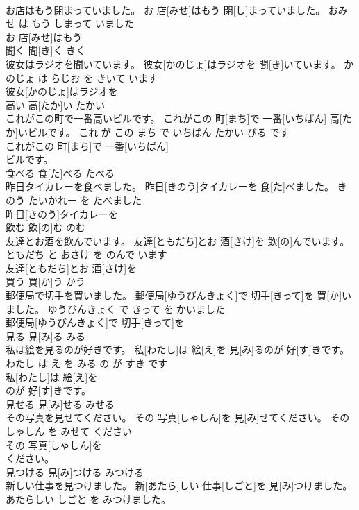 \documentclass[8pt]{extreport}
\begin{document}
\begin{CJK}{UTF8}{min}
\\	お店はもう閉まっていました。	お 店[みせ]はもう 閉[し]まっていました。	おみせ は もう しまって いました	
\\	お 店[みせ]はもう
\\	聞く	聞[き]く	きく	
\\	彼女はラジオを聞いています。	彼女[かのじょ]はラジオを 聞[き]いています。	かのじょ は らじお を きいて います	
\\	彼女[かのじょ]はラジオを
\\	高い	高[たか]い	たかい	
\\	これがこの町で一番高いビルです。	これがこの 町[まち]で 一番[いちばん] 高[たか]いビルです。	これ が この まち で いちばん たかい びる です	
\\	これがこの 町[まち]で 一番[いちばん]
\\	ビルです。			
\\	食べる	食[た]べる	たべる	
\\	昨日タイカレーを食べました。	昨日[きのう]タイカレーを 食[た]べました。	きのう たいかれー を たべました	
\\	昨日[きのう]タイカレーを
\\	飲む	飲[の]む	のむ	
\\	友達とお酒を飲んでいます。	友達[ともだち]とお 酒[さけ]を 飲[の]んでいます。	ともだち と おさけ を のんで います	
\\	友達[ともだち]とお 酒[さけ]を
\\	買う	買[か]う	かう	
\\	郵便局で切手を買いました。	郵便局[ゆうびんきょく]で 切手[きって]を 買[か]いました。	ゆうびんきょく で きって を かいました	
\\	郵便局[ゆうびんきょく]で 切手[きって]を
\\	見る	見[み]る	みる	
\\	私は絵を見るのが好きです。	私[わたし]は 絵[え]を 見[み]るのが 好[す]きです。	わたし は え を みる の が すき です	
\\	私[わたし]は 絵[え]を
\\	のが 好[す]きです。			
\\	見せる	見[み]せる	みせる	
\\	その写真を見せてください。	その 写真[しゃしん]を 見[み]せてください。	その しゃしん を みせて ください	
\\	その 写真[しゃしん]を
\\	ください。			
\\	見つける	見[み]つける	みつける	
\\	新しい仕事を見つけました。	新[あたら]しい 仕事[しごと]を 見[み]つけました。	あたらしい しごと を みつけました。	

\end{CJK}
\end{document}
